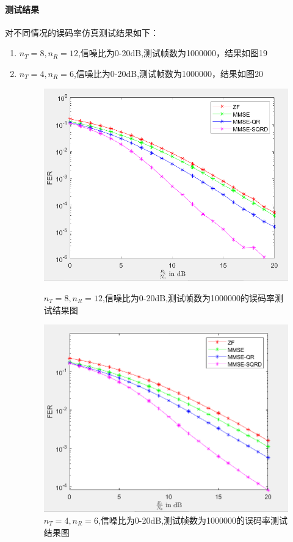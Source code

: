 \documentclass[a4paper,12pt]{article}
\begin{document}
	\paragraph{测试结果}
	对不同情况的误码率仿真测试结果如下：
	\begin{enumerate}
		\item $n_T=8,n_R=12$,信噪比为0-20dB,测试帧数为1000000，结果如图19
		\item $n_T=4,n_R=6$,信噪比为0-20dB,测试帧数为1000000，结果如图20
		\begin{figure}[h]
			\centering
			\begin{minipage}{0.4\textwidth}
				\centering
				\includegraphics[width=\textwidth]{20.png}
				\caption{$n_T=8,n_R=12$,信噪比为0-20dB,测试帧数为1000000的误码率测试结果图}
			\end{minipage}
			\qquad
			\begin{minipage}{0.4\textwidth}
				\centering
				\includegraphics[width=\textwidth]{21.png}
				\caption{$n_T=4,n_R=6$,信噪比为0-20dB,测试帧数为1000000的误码率测试结果图}
			\end{minipage}
		\end{figure}
	\end{enumerate}
	\newpage
\end{document}
